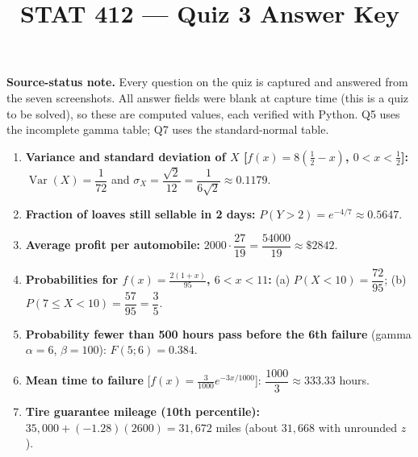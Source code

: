 \documentclass[11pt]{article}
\title{STAT 412 --- Quiz 3 Answer Key}
\author{}
\date{}
\begin{document}
\maketitle

\noindent\textbf{Source-status note.} Every question on the quiz is captured and
answered from the seven screenshots. All answer fields were blank at capture
time (this is a quiz to be solved), so these are computed values, each verified
with Python. Q5 uses the incomplete gamma table; Q7 uses the standard-normal
table.

\begin{enumerate}[leftmargin=*,label=\textbf{\arabic*.}]
\item \textbf{Variance and standard deviation of $X$
[$f(x)=8(\tfrac12-x)$, $0<x<\tfrac12$]:}
$\operatorname{Var}(X)=\dfrac{1}{72}$ and
$\sigma_X=\dfrac{\sqrt2}{12}=\dfrac{1}{6\sqrt2}\approx0.1179$.

\item \textbf{Fraction of loaves still sellable in 2 days:}
$P(Y>2)=e^{-4/7}\approx 0.5647$.

\item \textbf{Average profit per automobile:}
$2000\cdot\dfrac{27}{19}=\dfrac{54000}{19}\approx \$2842$.

\item \textbf{Probabilities for $f(x)=\tfrac{2(1+x)}{95}$, $6<x<11$:}
(a) $P(X<10)=\dfrac{72}{95}$;
(b) $P(7\le X<10)=\dfrac{57}{95}=\dfrac35$.

\item \textbf{Probability fewer than 500 hours pass before the 6th failure}
(gamma $\alpha=6$, $\beta=100$): $F(5;6)=0.384$.

\item \textbf{Mean time to failure}
[$f(x)=\tfrac{3}{1000}e^{-3x/1000}$]: $\dfrac{1000}{3}\approx 333.33$ hours.

\item \textbf{Tire guarantee mileage (10th percentile):}
$35{,}000+(-1.28)(2600)=31{,}672$ miles (about $31{,}668$ with unrounded $z$).
\end{enumerate}
\end{document}
